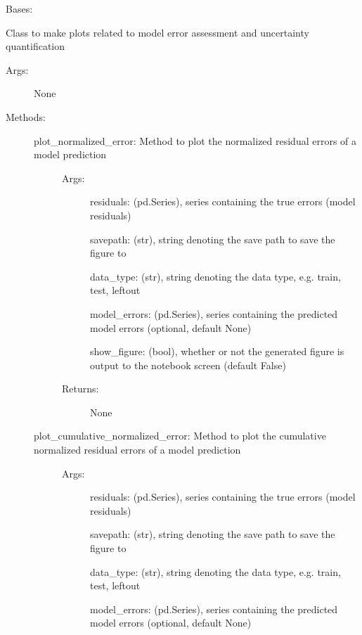\documentclass[letterpaper,10pt,english]{sphinxmanual}
\begin{document}
\begin{fulllineitems}
\label{\detokenize{api/mastml.plots.Error:mastml.plots.Error}}
Bases: 

Class to make plots related to model error assessment and uncertainty quantification
\begin{description}
\item[{Args:}] \leavevmode
None

\item[{Methods:}] \leavevmode\begin{description}
\item[{plot\_normalized\_error: Method to plot the normalized residual errors of a model prediction}] \leavevmode\begin{description}
\item[{Args:}] \leavevmode
residuals: (pd.Series), series containing the true errors (model residuals)

savepath: (str), string denoting the save path to save the figure to

data\_type: (str), string denoting the data type, e.g. train, test, leftout

model\_errors: (pd.Series), series containing the predicted model errors (optional, default None)

show\_figure: (bool), whether or not the generated figure is output to the notebook screen (default False)

\item[{Returns:}] \leavevmode
None

\end{description}

\item[{plot\_cumulative\_normalized\_error: Method to plot the cumulative normalized residual errors of a model prediction}] \leavevmode\begin{description}
\item[{Args:}] \leavevmode
residuals: (pd.Series), series containing the true errors (model residuals)

savepath: (str), string denoting the save path to save the figure to

data\_type: (str), string denoting the data type, e.g. train, test, leftout

model\_errors: (pd.Series), series containing the predicted model errors (optional, default None)


\end{description}
\end{description}
\end{description}
\end{fulllineitems}
\end{document}
